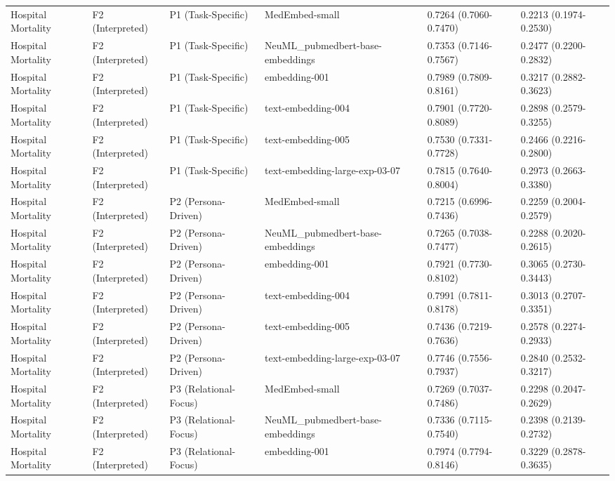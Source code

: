 \begin{tabular}{llllll}
Hospital Mortality & F2 (Interpreted) & P1 (Task-Specific) & MedEmbed-small & 0.7264 (0.7060-0.7470) & 0.2213 (0.1974-0.2530) \\
Hospital Mortality & F2 (Interpreted) & P1 (Task-Specific) & NeuML\_pubmedbert-base-embeddings & 0.7353 (0.7146-0.7567) & 0.2477 (0.2200-0.2832) \\
Hospital Mortality & F2 (Interpreted) & P1 (Task-Specific) & embedding-001 & 0.7989 (0.7809-0.8161) & 0.3217 (0.2882-0.3623) \\
Hospital Mortality & F2 (Interpreted) & P1 (Task-Specific) & text-embedding-004 & 0.7901 (0.7720-0.8089) & 0.2898 (0.2579-0.3255) \\
Hospital Mortality & F2 (Interpreted) & P1 (Task-Specific) & text-embedding-005 & 0.7530 (0.7331-0.7728) & 0.2466 (0.2216-0.2800) \\
Hospital Mortality & F2 (Interpreted) & P1 (Task-Specific) & text-embedding-large-exp-03-07 & 0.7815 (0.7640-0.8004) & 0.2973 (0.2663-0.3380) \\
Hospital Mortality & F2 (Interpreted) & P2 (Persona-Driven) & MedEmbed-small & 0.7215 (0.6996-0.7436) & 0.2259 (0.2004-0.2579) \\
Hospital Mortality & F2 (Interpreted) & P2 (Persona-Driven) & NeuML\_pubmedbert-base-embeddings & 0.7265 (0.7038-0.7477) & 0.2288 (0.2020-0.2615) \\
Hospital Mortality & F2 (Interpreted) & P2 (Persona-Driven) & embedding-001 & 0.7921 (0.7730-0.8102) & 0.3065 (0.2730-0.3443) \\
Hospital Mortality & F2 (Interpreted) & P2 (Persona-Driven) & text-embedding-004 & 0.7991 (0.7811-0.8178) & 0.3013 (0.2707-0.3351) \\
Hospital Mortality & F2 (Interpreted) & P2 (Persona-Driven) & text-embedding-005 & 0.7436 (0.7219-0.7636) & 0.2578 (0.2274-0.2933) \\
Hospital Mortality & F2 (Interpreted) & P2 (Persona-Driven) & text-embedding-large-exp-03-07 & 0.7746 (0.7556-0.7937) & 0.2840 (0.2532-0.3217) \\
Hospital Mortality & F2 (Interpreted) & P3 (Relational-Focus) & MedEmbed-small & 0.7269 (0.7037-0.7486) & 0.2298 (0.2047-0.2629) \\
Hospital Mortality & F2 (Interpreted) & P3 (Relational-Focus) & NeuML\_pubmedbert-base-embeddings & 0.7336 (0.7115-0.7540) & 0.2398 (0.2139-0.2732) \\
Hospital Mortality & F2 (Interpreted) & P3 (Relational-Focus) & embedding-001 & 0.7974 (0.7794-0.8146) & 0.3229 (0.2878-0.3635) \\

\end{tabular}
